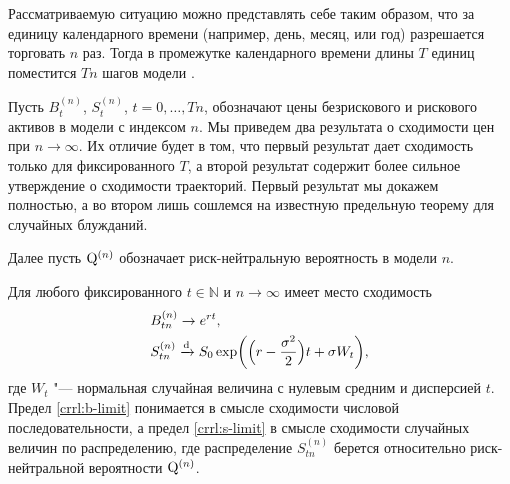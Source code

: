 Рассматриваемую ситуацию можно представлять себе таким образом, что за единицу календарного времени (например, день, месяц, или год) разрешается торговать $n$ раз.
Тогда в промежутке календарного времени длины $T$ единиц поместится $Tn$ шагов модели \crr. 

Пусть $B^{(n)}_t$, $S^{(n)}_t$, $t=0,\dots,Tn$, обозначают цены безрискового и рискового активов в модели с индексом $n$.
Мы приведем два результата о сходимости цен при $n\to\infty$.
Их отличие будет в том, что первый результат дает сходимость только для фиксированного $T$, а второй результат содержит более сильное утверждение о сходимости траекторий.
Первый результат мы докажем полностью, а во втором лишь сошлемся на известную предельную теорему для случайных блужданий.

Далее пусть $\mathrm{Q}^{(n)}$ обозначает риск-нейтральную вероятность в модели $n$.

\begin{proposition}
\label{crrl:p:convergence-1}
Для любого фиксированного $t\in\mathbb{N}$ и $n\to\infty$ имеет место сходимость
\begin{align}
\label{crrl:b-limit}
&B_{tn}^{(n)} \to e^{rt},\\
\label{crrl:s-limit}
&S_{tn}^{(n)} \xrightarrow{\text{d}} S_0 \exp\biggl(\Bigl(r- \frac{\sigma^2}{2}\Bigr) t + \sigma W_t\biggr),
\end{align}
где $W_t$ "--- нормальная случайная величина с нулевым средним и дисперсией $t$. 
Предел \eqref{crrl:b-limit} понимается в смысле сходимости числовой последовательности, а предел \eqref{crrl:s-limit} в смысле сходимости случайных величин по распределению, где распределение $S_{tn}^{(n)}$ берется относительно риск-нейтральной вероятности $\mathrm{Q}^{(n)}$.
\end{proposition}

